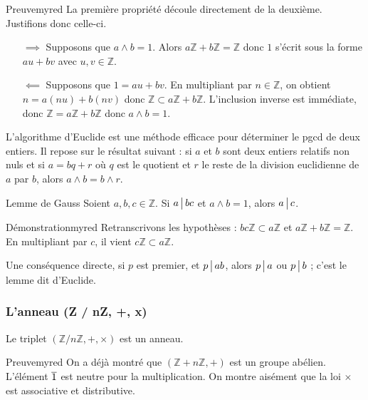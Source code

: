     \begin{demo}{Preuve}{myred}
        La première propriété découle directement de la deuxième. Justifions donc celle-ci.
        \begin{itemize}
            \item[$\implies$] Supposons que $a \wedge b = 1$. Alors $a \mathbb{Z} + b \mathbb{Z} = \mathbb{Z}$ donc $1$ s’écrit sous la forme $au + bv$ avec $u,v \in \mathbb{Z}$.
            \item[$\impliedby$] Supposons que $1 = au + bv$. En multipliant par $n \in \mathbb{Z}$, on obtient $n = a(nu) + b(nv)$ donc $\mathbb{Z} \subset a \mathbb{Z} + b \mathbb{Z}$. L’inclusion inverse est immédiate, donc $\mathbb{Z} = a \mathbb{Z} + b \mathbb{Z}$ donc $a \wedge b = 1$. 
        \end{itemize}
    \end{demo}

    L’algorithme d’Euclide est une méthode efficace pour déterminer le pgcd de deux entiers. Il repose sur le résultat suivant : si $a$ et $b$ sont deux entiers relatifs non nuls et si $a = bq + r$ où $q$ est le quotient et $r$ le reste de la division euclidienne de $a$ par $b$, alors $a \wedge b = b \wedge r$.

    \begin{theo}{Lemme de Gauss}{}
        Soient $a,b,c \in \mathbb{Z}$. Si $a \, \big| \, bc$ et $a \wedge b = 1$, alors $a \, \big| \, c$.
    \end{theo}

    \begin{demo}{Démonstration}{myred}
        Retranscrivons les hypothèses : $bc \mathbb{Z} \subset a \mathbb{Z}$ et $a \mathbb{Z} + b \mathbb{Z} = \mathbb{Z}$. En multipliant par $c$, il vient $c \mathbb{Z} \subset a \mathbb{Z}$.
    \end{demo}

    Une conséquence directe, si $p$ est premier, et $p \, \big| \, ab$, alors $p \, \big| \, a$ ou $p \, \big| \, b$ ; c’est le lemme dit d’Euclide. 

    \subsubsection{L’anneau (Z / nZ, +, x)}

    \begin{theo}{}{}
        Le triplet $(\mathbb{Z} / n \mathbb{Z}, +, \times)$ est un anneau.
    \end{theo}

    \begin{demo}{Preuve}{myred}
        On a déjà montré que $(\mathbb{Z} + n \mathbb{Z}, +)$ est un groupe abélien. L’élément $\overline{1}$ est neutre pour la multiplication. On montre aisément que la loi $\times$ est associative et distributive.
    \end{demo}

